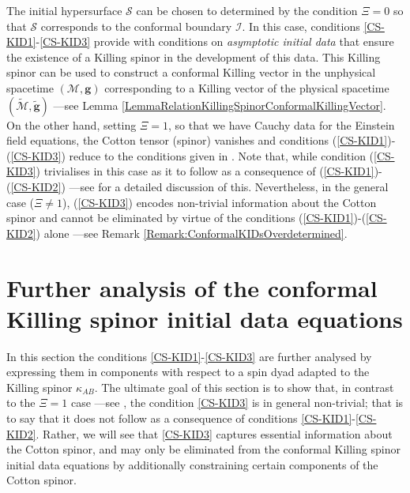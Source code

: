 \documentclass[10pt,a4paper]{article}
\theoremstyle{plain}
\def\bmg{{\bm g}}
\begin{document}
 The initial hypersurface $\mathcal{S}$ can be chosen to
  determined by the condition $\Xi=0$ so that $\mathcal{S}$
  corresponds to the conformal boundary $\mathscr{I}$.  In this case,
  conditions \eqref{CS-KID1}-\eqref{CS-KID3} provide with conditions
  on \emph{asymptotic initial data} that ensure the existence of a
  Killing spinor in the development of this data.  This Killing spinor
  can be used to construct a conformal Killing vector in the
  unphysical spacetime $(\mathcal{M},\bmg)$ corresponding to a Killing
  vector of the physical spacetime
  $(\tilde{\mathcal{M}},\tilde{\bmg})$ ---see Lemma
  \ref{LemmaRelationKillingSpinorConformalKillingVector}. On the other hand, 
  setting $\Xi= 1$, so that we have Cauchy data for the Einstein
  field equations, the Cotton tensor (spinor) vanishes and conditions
  (\ref{CS-KID1})-(\ref{CS-KID3}) reduce to the conditions given in
  \cite{BaeVal10a,BaeVal10b,BaeVal11b}. Note that, while condition
  (\ref{CS-KID3}) trivialises in this case as it to follow as a
  consequence of (\ref{CS-KID1})-(\ref{CS-KID2}) ---see
  \cite{BaeVal12} for a detailed discussion of this.  Nevertheless, in
  the general case ($\Xi\neq 1$), (\ref{CS-KID3}) encodes non-trivial
  information about the Cotton spinor and cannot be eliminated by
  virtue of the conditions (\ref{CS-KID1})-(\ref{CS-KID2}) alone
  ---see Remark \ref{Remark:ConformalKIDsOverdetermined}.


\section{Further analysis of the conformal Killing spinor initial data equations}\label{Sec:FurtherAnalysis}

In this section the conditions \eqref{CS-KID1}-\eqref{CS-KID3} are
further analysed by expressing them in components with respect to a
spin dyad adapted to the Killing spinor $\kappa_{AB}$.  The ultimate
goal of this section is to show that, in contrast to the $\Xi= 1$ case
---see \cite{BaeVal12}, the condition \eqref{CS-KID3} is in general
non-trivial; that is to say that it does not follow as a consequence
of conditions \eqref{CS-KID1}-\eqref{CS-KID2}. Rather, we will see
that \eqref{CS-KID3} captures essential information about the Cotton
spinor, and may only be eliminated from the conformal Killing spinor
initial data equations by additionally constraining certain components
of the Cotton spinor.

\medskip 
\end{document}
